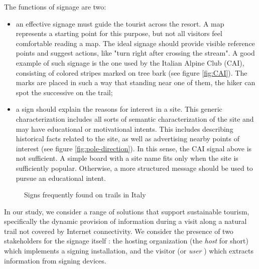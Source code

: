 \documentclass[sustainability,article,submit,pdftex,moreauthors]{Definitions/mdpi}
\begin{document}
The functions of signage are two:
\begin {itemize}
\item an effective signage must guide the tourist across the resort. A map represents a starting point for this purpose, but not all visitors feel comfortable reading a map. The ideal signage should provide visible reference points and suggest actions, like "turn right after crossing the stream". A good example of such signage is the one used by the Italian Alpine Club (CAI), consisting of colored stripes marked on tree bark (see figure \ref{fig:CAI}). The marks are placed in such a way that standing near one of them, the hiker can spot the successive on the trail;
 \item a sign should explain the reasons for interest in a site. This generic characterization includes all sorts of semantic characterization of the site and may have educational or motivational intents. This includes describing historical facts related to the site, as well as advertising nearby points of interest (see figure \ref{fig:pole-direction}). In this sense, the CAI signal above is not sufficient. A simple board with a site name fits only when the site is sufficiently popular. Otherwise, a more structured message should be used to pursue an educational intent.
\end{itemize}

\begin{figure}
\hfill
{}
\caption{Signs frequently found on trails in Italy}
\label{fig:traditional}
\end{figure}

In our study, we consider a range of solutions that support sustainable tourism, specifically the dynamic provision of information during a visit along a natural trail not covered by Internet connectivity. We consider the presence of two stakeholders for the signage itself \cite{wan22a}: the hosting organization (the {\em host} for short) which implements a signing installation, and the visitor (or {\em user} ) which extracts information from signing devices. 
\end{document}
